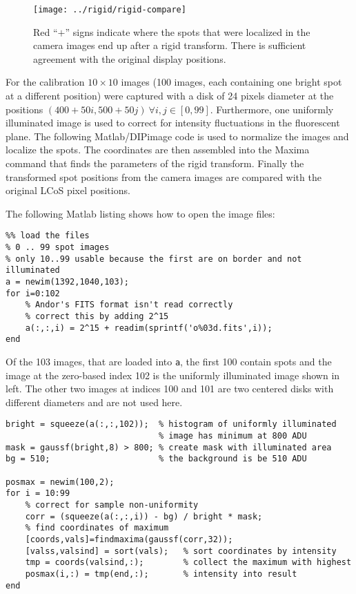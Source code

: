 
\begin{figure}[!hbt]
  \centering
  \texttt{[image: ../rigid/rigid-compare]}
  \caption{Red ``$+$'' signs indicate where the spots that were
    localized in the camera images end up after a rigid
    transform. There is sufficient agreement with the original
    display positions.}
  \label{fig:rigid-compare}
\end{figure}

For the calibration $10\times10$ images (100 images, each containing
one bright spot at a different position) were captured with a disk of
24 pixels diameter at the positions $(400+50i,500+50j)\ \forall i,j\in
[0,99]$. Furthermore, one uniformly illuminated image is used to
correct for intensity fluctuations in the fluorescent plane.  The
following Matlab/DIPimage code is used to normalize the images and
localize the spots. The coordinates are then assembled into the Maxima
command that finds the parameters of the rigid transform. Finally the
transformed spot positions from the camera images are compared with
the original LCoS pixel positions.

The following Matlab listing shows how to open the image files:
{\small
\begin{verbatim}
%% load the files
% 0 .. 99 spot images
% only 10..99 usable because the first are on border and not illuminated
a = newim(1392,1040,103);
for i=0:102
    % Andor's FITS format isn't read correctly
    % correct this by adding 2^15
    a(:,:,i) = 2^15 + readim(sprintf('o%03d.fits',i));
end
\end{verbatim}}

  Of the 103 images, that are loaded into \verb!a!, the first 100
  contain spots and the image at the zero-based index 102 is the
  uniformly illuminated image shown in  left.
  The other two images at indices 100 and 101 are two centered disks
  with different diameters and are not used here.

{\small
\begin{verbatim}
bright = squeeze(a(:,:,102));  % histogram of uniformly illuminated
                               % image has minimum at 800 ADU
mask = gaussf(bright,8) > 800; % create mask with illuminated area
bg = 510;                      % the background is be 510 ADU

posmax = newim(100,2);
for i = 10:99
    % correct for sample non-uniformity 
    corr = (squeeze(a(:,:,i)) - bg) / bright * mask;
    % find coordinates of maximum
    [coords,vals]=findmaxima(gaussf(corr,32));
    [valss,valsind] = sort(vals);   % sort coordinates by intensity
    tmp = coords(valsind,:);        % collect the maximum with highest
    posmax(i,:) = tmp(end,:);       % intensity into result
end
\end{verbatim}}
  
